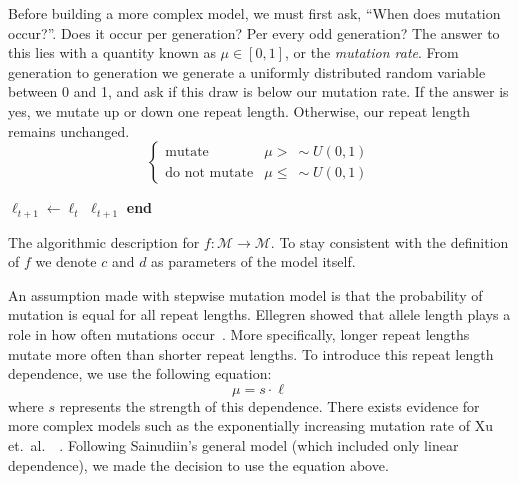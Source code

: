 Before building a more complex model, we must first ask, ``When does mutation occur?''.
Does it occur per generation?
Per every odd generation?
The answer to this lies with a quantity known as $\mu \in [0, 1]$, or the \emph{mutation rate}.
From generation to generation we generate a uniformly distributed random variable between 0 and 1, and ask if this draw
is below our mutation rate.
If the answer is yes, we mutate up or down one repeat length.
Otherwise, our repeat length remains unchanged.
\begin{equation}
    \begin{cases}
        \text{mutate} & \mu > \ \sim U(0, 1) \\
        \text{do not mutate} & \mu \leq \ \sim U(0, 1)
    \end{cases}
\end{equation}

\begin{algorithm}[t]
    \SetAlgoLined
    \DontPrintSemicolon
     {
        $\ell_{t+1} \gets \ell_t$ \;
        \Return $\ell_{t+1}$ \;
    }
    \textbf{end} \;
    \caption{The algorithmic description for $f: \mathcal{M} \rightarrow \mathcal{M}$.
    To stay consistent with the definition of $f$ we denote $c$ and $d$ as parameters of the model itself.}
    \label{alg:mutateFunction}
\end{algorithm}

An assumption made with stepwise mutation model is that the probability of mutation is equal for all repeat lengths.
Ellegren showed that allele length plays a role in how often mutations
occur~\cite{ellegrenHeterogeneousMutationProcesses2000}.
More specifically, longer repeat lengths mutate more often than shorter repeat lengths.
To introduce this repeat length dependence, we use the following equation:
\begin{equation}
    \mu = s \cdot \ell
\end{equation}
where $s$ represents the strength of this dependence.
There exists evidence for more complex models such as the exponentially increasing mutation rate of Xu et.\ al.\
~\cite{xuDirectionMicrosatelliteMutations2000}.
Following Sainudiin's general model (which included only linear dependence), we made the decision to use the equation
above.

